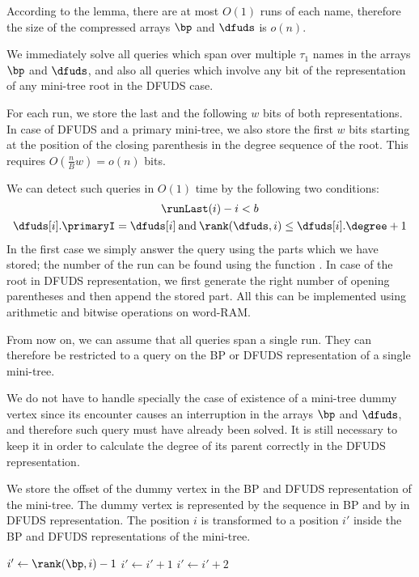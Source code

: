 According to the lemma, there are at most $O(1)$ runs of each name, therefore the size of the compressed arrays $\bp$ and $\dfuds$ is $o(n)$.

\bigbreak

We immediately solve all queries which span over multiple $\tau_1$ names in the arrays $\bp$ and $\dfuds$, and also all queries which involve any bit of the representation of any mini-tree root in the DFUDS case.

For each run, we store the last and the following $w$ bits of both representations.
In case of DFUDS and a primary mini-tree, we also store the first $w$ bits starting at the position of the closing parenthesis in the degree sequence of the root.
This requires $O(\frac{n}{B} w) = o(n)$ bits.

We can detect such queries in $O(1)$ time by the following two conditions:
\begin{gather*}
	\runLast(i) - i < b \\
	\dfuds[i].\primaryI = \dfuds[i] \booland \rank(\dfuds, i) \le \dfuds[i].\degree + 1
\end{gather*}
In the first case we simply answer the query using the parts which we have stored; the number of the run can be found using the function \elementIndex{}.
In case of the root in DFUDS representation, we first generate the right number of opening parentheses and then append the stored part.
All this can be implemented using arithmetic and bitwise operations on word-RAM.

From now on, we can assume that all queries span a single run.
They can therefore be restricted to a query on the BP or DFUDS representation of a single mini-tree.

We do not have to handle specially the case of existence of a mini-tree dummy vertex since its encounter causes an interruption in the arrays $\bp$ and $\dfuds$, and therefore such query must have already been solved.
It is still necessary to keep it in order to calculate the degree of its parent correctly in the DFUDS representation.

We store the offset of the dummy vertex in the BP and DFUDS representation of the mini-tree.
The dummy vertex is represented by the sequence \str{()} in BP and by \str{)} in DFUDS representation.
The position $i$ is transformed to a position $i'$ inside the BP and DFUDS representations of the mini-tree.

\begin{algorithm}
\begin{algorithmic}
	\State $i' \gets \rank(\bp, i) - 1$
	 
		\State $i' \gets i' + 1$ 
	\EndIf
	 
		\State $i' \gets i' + 2$ 
	\EndIf
\EndFunction
\end{algorithmic}
\end{algorithm}

